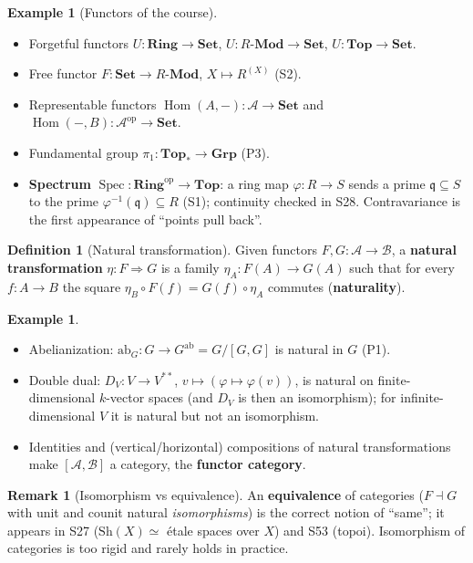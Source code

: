 \documentclass[11pt,a4paper]{article}
\theoremstyle{definition}
\newtheorem{definition}[theorem]{Definition}
\newtheorem{example}[theorem]{Example}
\newtheorem{remark}[theorem]{Remark}
\newcommand{\Hom}{\operatorname{Hom}}
\newcommand{\Spec}{\operatorname{Spec}}
\newcommand{\Set}{\mathbf{Set}}
\newcommand{\Grp}{\mathbf{Grp}}
\newcommand{\Ring}{\mathbf{Ring}}
\newcommand{\Top}{\mathbf{Top}}
\newcommand{\q}{\mathfrak{q}}
\begin{document}
\begin{example}[Functors of the course]\label{ex:functors}
\begin{itemize}
  \item Forgetful functors $U:\Ring\to\Set$, $U:R\text{-}\mathbf{Mod}\to\Set$, $U:\Top\to\Set$.
  \item Free functor $F:\Set\to R\text{-}\mathbf{Mod}$, $X\mapsto R^{(X)}$ (S2).
  \item Representable functors $\Hom(A,-):\mathcal A\to\Set$ and $\Hom(-,B):\mathcal A^{\mathrm{op}}\to\Set$.
  \item Fundamental group $\pi_1:\Top_*\to\Grp$ (P3).
  \item \textbf{Spectrum} $\Spec:\Ring^{\mathrm{op}}\to\Top$: a ring map $\varphi:R\to S$ sends a prime
    $\q\subseteq S$ to the prime $\varphi^{-1}(\q)\subseteq R$ (S1); continuity checked in S28.
    Contravariance is the first appearance of ``points pull back''.
\end{itemize}
\end{example}

\begin{definition}[Natural transformation]
Given functors $F,G:\mathcal A\to\mathcal B$, a \textbf{natural transformation}
$\eta:F\Rightarrow G$ is a family $\eta_A:F(A)\to G(A)$ such that for every $f:A\to B$ the square
$\eta_B\circ F(f)=G(f)\circ\eta_A$ commutes (\textbf{naturality}).
\end{definition}

\begin{example}\label{ex:nat}
\begin{itemize}
  \item Abelianization: $\mathrm{ab}_G:G\to G^{\mathrm{ab}}=G/[G,G]$ is natural in $G$ (P1).
  \item Double dual: $D_V:V\to V^{**}$, $v\mapsto(\varphi\mapsto\varphi(v))$, is natural on
    finite-dimensional $k$-vector spaces (and $D_V$ is then an isomorphism); for infinite-dimensional
    $V$ it is natural but not an isomorphism.
  \item Identities and (vertical/horizontal) compositions of natural transformations make
    $[\mathcal A,\mathcal B]$ a category, the \textbf{functor category}.
\end{itemize}
\end{example}

\begin{remark}[Isomorphism vs equivalence]
An \textbf{equivalence} of categories ($F\dashv G$ with unit and counit natural \emph{isomorphisms})
is the correct notion of ``same''; it appears in S27 ($\mathrm{Sh}(X)\simeq$ \'etale spaces over $X$)
and S53 (topoi). Isomorphism of categories is too rigid and rarely holds in practice.
\end{remark}
\end{document}
